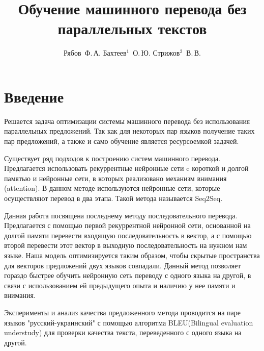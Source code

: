 \documentclass[12pt,twoside]{article}
\title
    [Обучение машинного перевода без параллельных текстов] %
    {Обучение машинного перевода без параллельных текстов}
\author
    [Рябов~Ф.\,А. Бахтеев$^1$~О.\,Ю.  Стрижов$^2$~В.\,В.] %
    {Рябов~Ф.\,А. Бахтеев$^1$~О.\,Ю.  Стрижов$^2$~В.\,В.} %
    [Рябов~Ф.\,А. Бахтеев$^1$~О.\,Ю.  Стрижов$^2$~В.\,В.] %
\begin{document}
\maketitle

\section{Введение}
{Решается задача оптимизации системы машинного перевода без использования параллельных предложений. Так как для некоторых пар языков получение таких пар предложений, а также и само обучение является ресурсоемкой задачей\cite{koehn2007moses,koehn2009statistical}. 

Существует ряд подходов к построению систем машинного перевода. Предлагается использовать рекуррентные нейронные сети c короткой и долгой памятью и нейронные сети, в которых реализовано механизм внимания (attention). В данном методе используются нейронные сети, которые осуществляют перевод в два этапа. Такой метода называется Seq2Seq\cite{weiss2017sequence}.

Данная работа посвящена последнему методу последовательного перевода. Предлагается с помощью первой рекуррентной нейронной сети, основанной на долгой памяти перевести входящую последовательность в вектор, а с помощью второй перевести этот вектор в выходную последовательность на нужном нам языке\cite{cho2014properties}. Наша модель оптимизируется таким образом, чтобы скрытые пространства для векторов предложений двух языков совпадали.
 Данный метод позволяет гораздо быстрее обучить нейронную сеть переводу с одного языка на другой, в связи с использованием ей предыдущего опыта и наличию у нее памяти и внимания.

Эксперименты и анализ качества предложенного метода проводится на паре языков "русский-украинский" с помощью алгоритма BLEU(Bilingual evaluation understudy) для проверки качества текста\cite{papineni2002bleu}, переведенного с одного языка на другой.}



\end{document}

